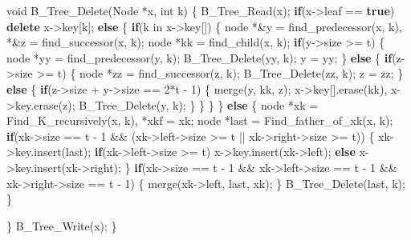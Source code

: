 \documentclass[]{article}
\newenvironment{Shaded}{}{}
\newcommand{\ControlFlowTok}[1]{\textcolor[rgb]{0.00,0.44,0.13}{\textbf{#1}}}
\newcommand{\DataTypeTok}[1]{\textcolor[rgb]{0.56,0.13,0.00}{#1}}
\newcommand{\DecValTok}[1]{\textcolor[rgb]{0.25,0.63,0.44}{#1}}
\newcommand{\KeywordTok}[1]{\textcolor[rgb]{0.00,0.44,0.13}{\textbf{#1}}}
\newcommand{\NormalTok}[1]{#1}
\begin{document}
\begin{Shaded}
  \begin{Highlighting}[]
  \DataTypeTok{void}\NormalTok{ B_Tree_Delete(Node *x, }\DataTypeTok{int}\NormalTok{ k) \{}
  \NormalTok{    B_Tree_Read(x);}
      \ControlFlowTok{if}\NormalTok{(x->leaf == }\KeywordTok{true}\NormalTok{) }
          \KeywordTok{delete}\NormalTok{ x->key[k];}
      \ControlFlowTok{else}\NormalTok{ \{}
          \ControlFlowTok{if}\NormalTok{(k in x->key[]) \{}
  \NormalTok{            node *&y = find_predecessor(x, k), *&z = find_successor(x, k);}
  \NormalTok{            node *kk = find_child(x, k);}
              \ControlFlowTok{if}\NormalTok{(y->size >= t) \{}
  \NormalTok{                node *yy = find_predecessor(y, k);}
  \NormalTok{                B_Tree_Delete(yy, k);}
  \NormalTok{                y = yy;}
  \NormalTok{            \}}
              \ControlFlowTok{else}\NormalTok{ \{}
                  \ControlFlowTok{if}\NormalTok{(z->size >= t) \{}
  \NormalTok{                    node *zz = find_successor(z, k);}
  \NormalTok{                    B_Tree_Delete(zz, k);}
  \NormalTok{                    z = zz;}
  \NormalTok{                \}}
                  \ControlFlowTok{else}\NormalTok{ \{}
                      \ControlFlowTok{if}\NormalTok{(z->size + y->size == }\DecValTok{2}\NormalTok{*t - }\DecValTok{1}\NormalTok{) \{}
  \NormalTok{                        merge(y, kk, z);}
  \NormalTok{                        x->key[].erase(kk), x->key.erase(z);}
  \NormalTok{                        B_Tree_Delete(y, k);}
  \NormalTok{                    \}}
  \NormalTok{                \}}
  \NormalTok{            \}}
  \NormalTok{        \}}
          \ControlFlowTok{else}\NormalTok{ \{}
  \NormalTok{            node *xk = Find_K_recursively(x, k), *xkf = xk;}
  \NormalTok{            node *last = Find_father_of_xk(x, k);}
              \ControlFlowTok{if}\NormalTok{(xk->size == t - }\DecValTok{1}\NormalTok{ && (xk->left->size >= t || xk->right->size >= t)) \{}
  \NormalTok{                xk->key.insert(last);}
                  \ControlFlowTok{if}\NormalTok{(xk->left->size >= t) x->key.insert(xk->left);}
                  \ControlFlowTok{else}\NormalTok{ x->key.insert(xk->right);}
  \NormalTok{            \}}
              \ControlFlowTok{if}\NormalTok{(xk->size == t - }\DecValTok{1}\NormalTok{ && xk->left->size == t - }\DecValTok{1}\NormalTok{ && xk->right->size == t - }\DecValTok{1}\NormalTok{) \{}
  \NormalTok{                merge(xk->left, last, xk);}
  \NormalTok{            \}}
  \NormalTok{            B_Tree_Delete(last, k);}
  \NormalTok{        \}}
          
  \NormalTok{    \}}
  \NormalTok{    B_Tree_Write(x);}
  \NormalTok{\}}
  \end{Highlighting}
  \end{Shaded}


  
  
\end{document}
